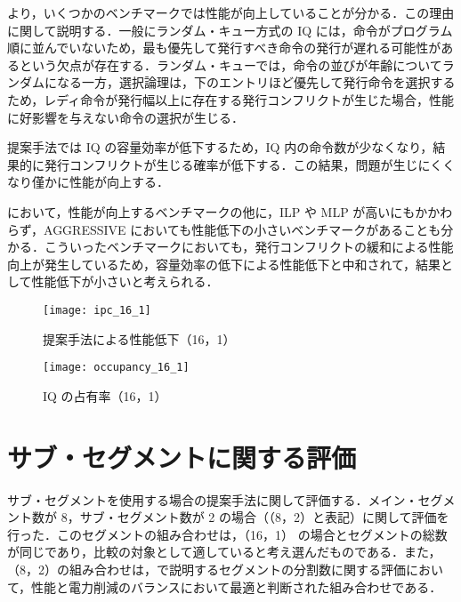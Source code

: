 より，いくつかのベンチマークでは性能が向上していることが分かる．この理由に関して説明する．一般にランダム・キュー方式の IQ には，命令がプログラム順に並んでいないため，最も優先して発行すべき命令の発行が遅れる可能性があるという欠点が存在する．ランダム・キューでは，命令の並びが年齢についてランダムになる一方，選択論理は，下のエントリほど優先して発行命令を選択するため，レディ命令が発行幅以上に存在する発行コンフリクトが生じた場合，性能に好影響を与えない命令の選択が生じる．

提案手法では IQ の容量効率が低下するため，IQ 内の命令数が少なくなり，結果的に発行コンフリクトが生じる確率が低下する．この結果，問題が生じにくくなり僅かに性能が向上する．

において，性能が向上するベンチマークの他に，ILP や MLP が高いにもかかわらず，AGGRESSIVE においても性能低下の小さいベンチマークがあることも分かる．こういったベンチマークにおいても，発行コンフリクトの緩和による性能向上が発生しているため，容量効率の低下による性能低下と中和されて，結果として性能低下が小さいと考えられる．

\begin{figure}[htb]
  \centering
  \texttt{[image: ipc\_16\_1]}
  \caption{提案手法による性能低下（16，1）}
  \label{fig:ipc_16_1}
\end{figure}

\begin{figure}[htb]
  \centering
  \texttt{[image: occupancy\_16\_1]}
  \caption{IQ の占有率（16，1）}
  \label{fig:occupancy_16_1}
\end{figure}

\clearpage

\section{サブ・セグメントに関する評価}
\label{sec:eval_subseg}
サブ・セグメントを使用する場合の提案手法に関して評価する．メイン・セグメント数が 8，サブ・セグメント数が 2 の場合（（8，2）と表記）に関して評価を行った．このセグメントの組み合わせは，（16，1） の場合とセグメントの総数が同じであり，比較の対象として適していると考え選んだものである．また，（8，2）の組み合わせは，で説明するセグメントの分割数に関する評価において，性能と電力削減のバランスにおいて最適と判断された組み合わせである．

